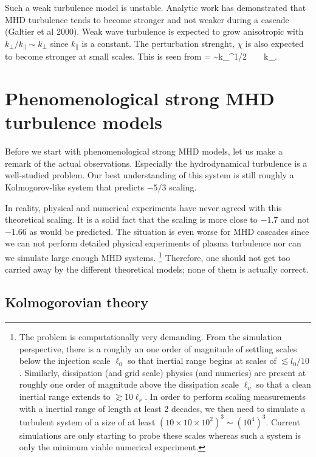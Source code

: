 \documentclass[usenatbib,twocolumn]{aastex63}
\begin{document}
Such a weak turbulence model is unstable.
Analytic work has demonstrated that MHD turbulence tends to become stronger and not weaker during a cascade (Galtier et al 2000).
Weak wave turbulence is expected to grow anisotropic with $k_\perp/k_\parallel \sim k_\perp$ since $k_\parallel$ is a constant.
The perturbation strenght, $\chi$ is also expected to become stronger at small scales.
This is seen from
\be
\chi =  \sim k_\perp^{1/2} \rightarrow \infty ~ ~ k_\perp \rightarrow \infty.
\ee



\section{Phenomenological strong MHD turbulence models}\label{sect:theory}

Before we start with phenomenological strong MHD models, let us make a remark of the actual observations.
Especially the hydrodynamical turbulence is a well-studied problem.
Our best understanding of this system is still roughly a Kolmogorov-like system that predicts $-5/3$ scaling.

In reality, physical and numerical experiments have never agreed with this theoretical scaling.
It is a solid fact that the scaling is more close to $-1.7$  and not $-1.66$ as would be predicted.
The situation is even worse for MHD cascades since we can not perform detailed physical experiments of plasma turbulence nor can we simulate large enough MHD systems.%
\footnote{
    The problem is computationally very demanding.
From the simulation perspective, there is a roughly an one order of magnitude of settling scales below the injection scale $\ell_0$ so that inertial range begins at scales of $\lesssim l_0/10$.
Similarly, dissipation (and grid scale) physics (and numerics) are present at roughly one order of magnitude above the dissipation scale $\ell_\nu$ so that a clean inertial range extends to $\gtrsim 10 \ell_\nu$.
In order to perform scaling measurements with a inertial range of length at least 2 decades, we then need to simulate a turbulent system of a size of at least $(10\times10\times10^2)^3 \sim (10^4)^3$.
Current simulations are only starting to probe these scales whereas such a system is only the minimum viable numerical experiment.
}
Therefore, one should not get too carried away by the different theoretical models;
none of them is actually correct.


\subsection{Kolmogorovian theory}\label{sect:K41}
\end{document}
